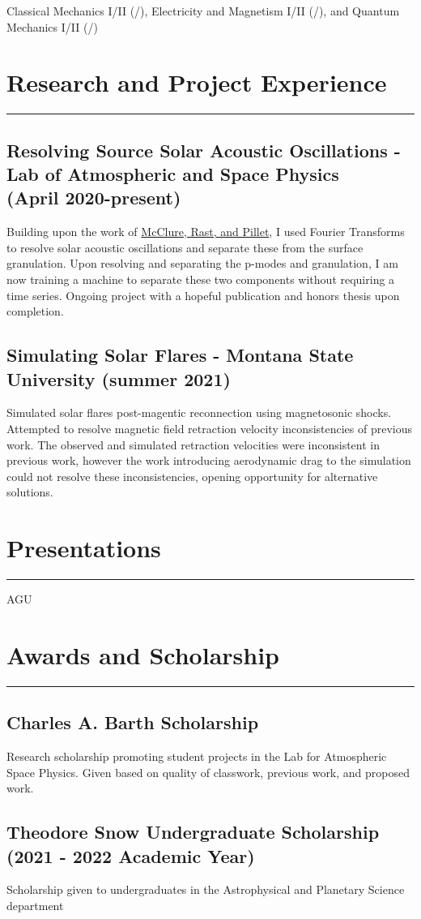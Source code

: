 \documentclass{article}
\newcommand{\divider}{\vskip-2pt\hrule\vskip4pt}
\begin{document}
Classical Mechanics I/II (/), Electricity and Magnetism I/II (/), and Quantum Mechanics I/II (/)

\section{Research and Project Experience}
\divider

\subsection{Resolving Source Solar Acoustic Oscillations - Lab of Atmospheric and Space Physics \\ (April 2020-present)}

Building upon the work of \href{https://arxiv.org/abs/1811.08944}{McClure, Rast, and Pillet}, I used Fourier Transforms to resolve solar acoustic oscillations and separate these from the surface granulation. Upon resolving and separating the p-modes and granulation, I am now training a machine to separate these two components without requiring a time series. Ongoing project with a hopeful publication and honors thesis upon completion. 

\subsection{Simulating Solar Flares - Montana State University (summer 2021)}

Simulated solar flares post-magentic reconnection using magnetosonic shocks. Attempted to resolve magnetic field retraction velocity inconsistencies of previous work. The observed and simulated retraction velocities were inconsistent in previous work, however the work introducing aerodynamic drag to the simulation could not resolve these inconsistencies, opening opportunity for alternative solutions. 

\section{Presentations}
\divider

AGU

\section{Awards and Scholarship}
\divider

\subsection{Charles A. Barth Scholarship}

Research scholarship promoting student projects in the Lab for Atmospheric Space Physics. Given based on quality of classwork, previous work, and proposed work. 

\subsection{Theodore Snow Undergraduate Scholarship (2021 - 2022 Academic Year)}

Scholarship given to undergraduates in the Astrophysical and Planetary Science department 
\end{document}
